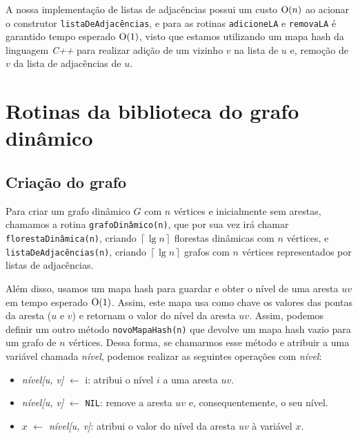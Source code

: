 A nossa implementação \cite{chung2025} de listas de adjacências possui um custo $\mathrm{O}(n)$ ao acionar o construtor \texttt{listaDeAdjacências}, e para 
as rotinas \texttt{adicioneLA} e \texttt{removaLA} é garantido tempo esperado $\mathrm{O}(1)$, visto que estamos utilizando um mapa hash da linguagem \textit{C++} para realizar adição de um vizinho $v$ na lista de $u$ e, remoção de $v$ da lista de adjacências de $u$.

\section{Rotinas da biblioteca do grafo dinâmico}

\subsection{Criação do grafo}
\label{sec:dynamic-graph-creation}

Para criar um grafo dinâmico $G$ com $n$ vértices e inicialmente sem arestas, chamamos a rotina \texttt{grafoDinâmico(n)}, que por sua vez irá chamar \texttt{florestaDinâmica(n)}, criando $\left\lceil \lg n \right\rceil$ florestas dinâmicas com $n$ vértices, e \texttt{listaDeAdjacências(n)}, criando $\left\lceil \lg n \right\rceil$ grafos com $n$ vértices representados por listas de adjacências. 

Além disso, usamos um mapa hash para guardar e obter o nível de uma aresta $uv$ em tempo esperado $\mathrm{O}(1)$. Assim, este mapa usa como chave os valores das pontas da aresta ($u$ e $v$) e retornam o valor do nível da aresta $uv$. Assim, podemos definir um outro método \texttt{novoMapaHash(n)} que devolve um mapa hash vazio para um grafo de $n$ vértices. Dessa forma, se chamarmos esse método e atribuir a uma variável chamada \textit{nível}, podemos realizar as seguintes operações com \textit{nível}:

\begin{itemize}
    \item \textit{nível[u, v]} $\leftarrow$ i: atribui o nível $i$ a uma aresta $uv$. 
    
    \item \textit{nível[u, v]} $\leftarrow$ \texttt{NIL}: remove a aresta $uv$ e, consequentemente, o seu nível.
    
    \item $x$ $\leftarrow$ \textit{nível[u, v]}: atribui o valor do nível da aresta $uv$ à variável $x$. 
\end{itemize}


